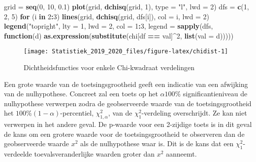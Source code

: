 \documentclass[12pt,dutch,coursenotes]{book}
\newenvironment{Shaded}{\begin{snugshade}}{\end{snugshade}}
\newcommand{\KeywordTok}[1]{\textcolor[rgb]{0.13,0.29,0.53}{\textbf{#1}}}
\newcommand{\DataTypeTok}[1]{\textcolor[rgb]{0.13,0.29,0.53}{#1}}
\newcommand{\DecValTok}[1]{\textcolor[rgb]{0.00,0.00,0.81}{#1}}
\newcommand{\FloatTok}[1]{\textcolor[rgb]{0.00,0.00,0.81}{#1}}
\newcommand{\StringTok}[1]{\textcolor[rgb]{0.31,0.60,0.02}{#1}}
\newcommand{\ControlFlowTok}[1]{\textcolor[rgb]{0.13,0.29,0.53}{\textbf{#1}}}
\newcommand{\OperatorTok}[1]{\textcolor[rgb]{0.81,0.36,0.00}{\textbf{#1}}}
\newcommand{\NormalTok}[1]{#1}
\theoremstyle{definition}
\theoremstyle{definition}
\theoremstyle{definition}
\theoremstyle{remark}
\begin{document}
\begin{Shaded}
\begin{Highlighting}[]
\NormalTok{grid =}\StringTok{ }\KeywordTok{seq}\NormalTok{(}\DecValTok{0}\NormalTok{, }\DecValTok{10}\NormalTok{, }\FloatTok{0.1}\NormalTok{)}
\KeywordTok{plot}\NormalTok{(grid, }\KeywordTok{dchisq}\NormalTok{(grid, }\DecValTok{1}\NormalTok{), }\DataTypeTok{type =} \StringTok{"l"}\NormalTok{, }\DataTypeTok{lwd =} \DecValTok{2}\NormalTok{)}
\NormalTok{dfs =}\StringTok{ }\KeywordTok{c}\NormalTok{(}\DecValTok{1}\NormalTok{, }\DecValTok{2}\NormalTok{, }\DecValTok{5}\NormalTok{)}
\ControlFlowTok{for}\NormalTok{ (i }\ControlFlowTok{in} \DecValTok{2}\OperatorTok{:}\DecValTok{3}\NormalTok{) }\KeywordTok{lines}\NormalTok{(grid, }\KeywordTok{dchisq}\NormalTok{(grid, dfs[i]), }\DataTypeTok{col =}\NormalTok{ i, }
    \DataTypeTok{lwd =} \DecValTok{2}\NormalTok{)}
\KeywordTok{legend}\NormalTok{(}\StringTok{"topright"}\NormalTok{, }\DataTypeTok{lty =} \DecValTok{1}\NormalTok{, }\DataTypeTok{lwd =} \DecValTok{2}\NormalTok{, }\DataTypeTok{col =} \DecValTok{1}\OperatorTok{:}\DecValTok{3}\NormalTok{, }\DataTypeTok{legend =} \KeywordTok{sapply}\NormalTok{(dfs, }
    \ControlFlowTok{function}\NormalTok{(d) }\KeywordTok{as.expression}\NormalTok{(}\KeywordTok{substitute}\NormalTok{(chi[df }\OperatorTok{==}\StringTok{ }
\StringTok{        }\NormalTok{val]}\OperatorTok{^}\DecValTok{2}\NormalTok{, }\KeywordTok{list}\NormalTok{(}\DataTypeTok{val =}\NormalTok{ d)))))}
\end{Highlighting}
\end{Shaded}

\begin{figure}

{\centering \texttt{[image: Statistiek\_2019\_2020\_files/figure-latex/chidist-1]} 

}

\caption{Dichtheidsfuncties voor enkele Chi-kwadraat verdelingen}\label{fig:chidist}
\end{figure}

Een grote waarde van de toetsingsgrootheid geeft een indicatie van een
afwijking van de nulhypothese. Concreet zal een toets op het
\(\alpha 100\%\) significantieniveau de nulhypothese verwerpen zodra de
geobserveerde waarde van de toetsingsgrootheid het
\(100\%(1-\alpha)\)-percentiel, \(\chi^2_{1, \alpha}\), van de
\(\chi^2_1\)-verdeling overschrijdt. Ze kan niet verwerpen in het andere
geval. De p-waarde voor een 2-zijdige toets is in dit geval de kans om
een grotere waarde voor de toetsingsgrootheid te observeren dan de
geobserveerde waarde \(x^2\) als de nulhypothese waar is. Dit is de kans
dat een \(\chi^2_1\)-verdeelde toevalsveranderlijke waarden groter dan
\(x^2\) aanneemt.
\end{document}
